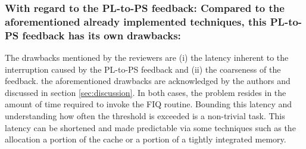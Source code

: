         \subsubsection{With regard to the PL-to-PS feedback: Compared to the aforementioned already implemented techniques, this PL-to-PS feedback has its own drawbacks:}
            The drawbacks mentioned by the reviewers are (i) the latency inherent to the interruption caused by the PL-to-PS feedback and (ii) the coarseness of the feedback.
            the aforementioned drawbacks are acknowledged by the authors and discussed in section \ref{sec:discussion}.
            In both cases, the problem resides in the amount of time required to invoke the FIQ routine. Bounding this latency and understanding how often the threshold is exceeded is a non-trivial task. This latency can be shortened and made predictable via some techniques such as the allocation a portion of the cache or a portion of a tightly integrated memory.
